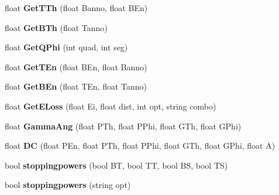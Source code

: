 \begin{DoxyCompactItemize}
\item 
\mbox{\label{classdoppler_a7865dcf92a6b18d23cb48e9e624e505b}} 
float {\bfseries Get\+T\+Th} (float Banno, float B\+En)
\item 
\mbox{\label{classdoppler_ac834d80156ae80009b508ae41fedde3d}} 
float {\bfseries Get\+B\+Th} (float Tanno)
\item 
\mbox{\label{classdoppler_a7c3afd05ed9ddb8c5bedc0de905acd0b}} 
float {\bfseries Get\+Q\+Phi} (int quad, int seg)
\item 
\mbox{\label{classdoppler_a31a09afe8920dc1302162ec8e0be9302}} 
float {\bfseries Get\+T\+En} (float B\+En, float Banno)
\item 
\mbox{\label{classdoppler_a182d987ddc6db4a8b8e7f7821bda3846}} 
float {\bfseries Get\+B\+En} (float T\+En, float Tanno)
\item 
\mbox{\label{classdoppler_a64570ec784dabd6e17cf836489450527}} 
float {\bfseries Get\+E\+Loss} (float Ei, float dist, int opt, string combo)
\item 
\mbox{\label{classdoppler_a6dca381f91f2267abefadd62cf66f69f}} 
float {\bfseries Gamma\+Ang} (float P\+Th, float P\+Phi, float G\+Th, float G\+Phi)
\item 
\mbox{\label{classdoppler_a7f08d93d2bfa269f8c22ac71b604b09a}} 
float {\bfseries DC} (float P\+En, float P\+Th, float P\+Phi, float G\+Th, float G\+Phi, float A)
\item 
\mbox{\label{classdoppler_af3fe2bbd813b2c84fc79b156879205fd}} 
bool {\bfseries stoppingpowers} (bool BT, bool TT, bool BS, bool TS)
\item 
\mbox{\label{classdoppler_a4be762591578e28f8e9d646475ca943a}} 
bool {\bfseries stoppingpowers} (string opt)
\end{DoxyCompactItemize}
